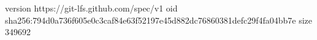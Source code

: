 version https://git-lfs.github.com/spec/v1
oid sha256:794d0a736f605e0c3caf84e63f52197e45d882dc76860381defc29f4fa04bb7e
size 349692
